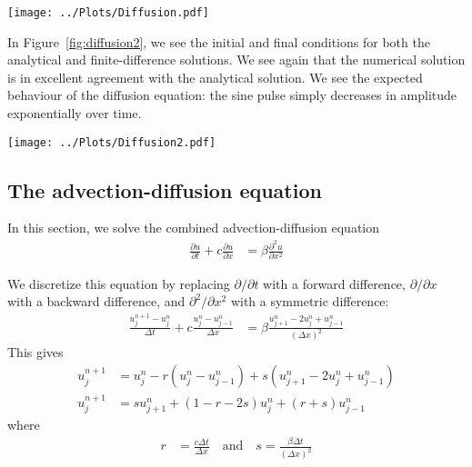 \documentclass[twocolumn]{myarticle}
\begin{document}
\begin{figure*}[ht]
    \centering
    \texttt{[image: ../Plots/Diffusion.pdf]}
    \caption{Numerical and analytical solutions to the diffusion equation: full solution.}
    \label{fig:diffusion}
\end{figure*}

In Figure~\ref{fig:diffusion2}, we see the initial and final conditions for both the analytical and finite-difference solutions.
We see again that the numerical solution is in excellent agreement with the analytical solution.
We see the expected behaviour of the diffusion equation: the sine pulse simply decreases in amplitude exponentially over time.

\begin{figure*}[ht]
    \centering
    \texttt{[image: ../Plots/Diffusion2.pdf]}
    \caption{Numerical and analytical solutions to the diffusion equation: initial and final states.}
    \label{fig:diffusion2}
\end{figure*}

\subsection{The advection-diffusion equation}
\label{subsec:the_advection_diffusion_equation}

In this section, we solve the combined advection-diffusion equation
\begin{align}
    \frac{\partial u}{\partial t} + c \frac{\partial u}{\partial x} &= \beta \frac{\partial^2 u}{\partial x^2}
\end{align}

We discretize this equation by replacing $ \partial/\partial t $ with a forward difference, $ \partial/\partial x $ with a backward difference, and $ \partial^2/\partial x^2 $ with a symmetric difference:
\begin{align}
    \frac{u^{n+1}_j - u^n_j}{\Delta t} + c \frac{u^n_j - u^n_{j-1}}{\Delta x} &= \beta \frac{u^n_{j+1} - 2 u^n_j + u^n_{j-1}}{(\Delta x)^2}
\end{align}
This gives
\begin{align}
    u^{n+1}_j &= u^n_j - r \left(u^n_j - u^n_{j-1}\right) + s \left(u^n_{j+1} - 2 u^n_j + u^n_{j-1} \right)
    \\
    u^{n+1}_j &= s u^n_{j+1} + (1 - r - 2s) u^n_j + (r + s) u^n_{j-1}
\end{align}
where
\begin{align}
    r &= \frac{c \Delta t}{\Delta x} \quad \text{and} \quad s = \frac{\beta \Delta t}{(\Delta x)^2}
\end{align}
\end{document}
